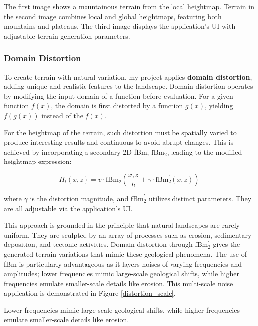 {The first image shows a mountainous terrain from the local heightmap. Terrain in the second image combines local and global heightmaps, featuring both mountains and plateaus. The third image displays the application's UI with adjustable terrain generation parameters.}


\subsubsection{Domain Distortion}

To create terrain with natural variation, my project applies \textbf{domain distortion}, adding unique and realistic features to the landscape. Domain distortion operates by modifying the input domain of a function before evaluation. For a given function $f(x)$, the domain is first distorted by a function $g(x)$, yielding $f(g(x))$ instead of the $f(x)$.

For the heightmap of the terrain, such distortion must be spatially varied to produce interesting results and continuous to avoid abrupt changes. This is achieved by incorporating a secondary 2D fBm, $\text{fBm}^\prime_2$, leading to the modified heightmap expression:

\begin{equation}
    H_l(x,z) = v\cdot\text{fBm}_{2}\left(\frac{x,z}{h}+\gamma\cdot\text{fBm}^\prime_2(x,z)\right)
\end{equation}

where $\gamma$ is the distortion magnitude, and $\text{fBm}^\prime_2$ utilizes distinct parameters. They are all adjustable via the application’s UI.

This approach is grounded in the principle that natural landscapes are rarely uniform. They are sculpted by an array of processes such as erosion, sedimentary deposition, and tectonic activities. Domain distortion through $\text{fBm}^\prime_2$ gives the generated terrain variations that mimic these geological phenomena. The use of fBm is particularly advantageous as it layers noises of varying frequencies and amplitudes; lower frequencies mimic large-scale geological shifts, while higher frequencies emulate smaller-scale details like erosion. This multi-scale noise application is demonstrated in Figure \ref{distortion_scale}.

{Lower frequencies mimic large-scale geological shifts, while higher frequencies emulate smaller-scale details like erosion.}

